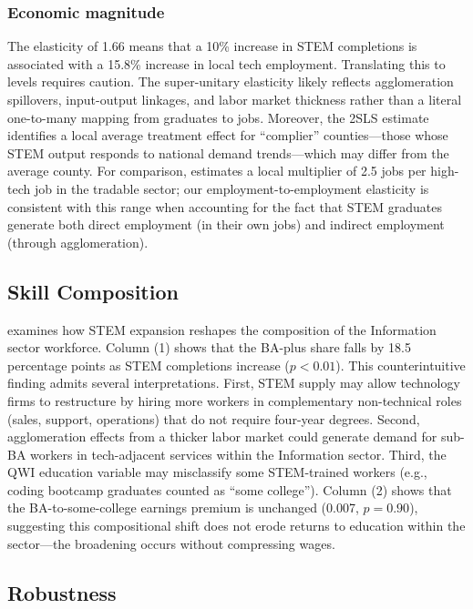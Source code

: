 \documentclass[12pt]{article}
\begin{document}
\subsubsection*{Economic magnitude} The elasticity of 1.66 means that a 10\% increase in STEM completions is associated with a 15.8\% increase in local tech employment. Translating this to levels requires caution. The super-unitary elasticity likely reflects agglomeration spillovers, input-output linkages, and labor market thickness rather than a literal one-to-many mapping from graduates to jobs. Moreover, the 2SLS estimate identifies a local average treatment effect for ``complier'' counties---those whose STEM output responds to national demand trends---which may differ from the average county. For comparison, \citet{moretti2010local} estimates a local multiplier of 2.5 jobs per high-tech job in the tradable sector; our employment-to-employment elasticity is consistent with this range when accounting for the fact that STEM graduates generate both direct employment (in their own jobs) and indirect employment (through agglomeration).

\subsection{Skill Composition}



 examines how STEM expansion reshapes the composition of the Information sector workforce. Column (1) shows that the BA-plus share falls by 18.5 percentage points as STEM completions increase ($p < 0.01$). This counterintuitive finding admits several interpretations. First, STEM supply may allow technology firms to restructure by hiring more workers in complementary non-technical roles (sales, support, operations) that do not require four-year degrees. Second, agglomeration effects from a thicker labor market could generate demand for sub-BA workers in tech-adjacent services within the Information sector. Third, the QWI education variable may misclassify some STEM-trained workers (e.g., coding bootcamp graduates counted as ``some college''). Column (2) shows that the BA-to-some-college earnings premium is unchanged (0.007, $p = 0.90$), suggesting this compositional shift does not erode returns to education within the sector---the broadening occurs without compressing wages.

\subsection{Robustness}
\end{document}
